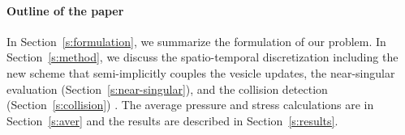 \paragraph{Outline of the paper} 
In Section~\ref{s:formulation}, we summarize the formulation of our
problem. In Section~\ref{s:method}, we discuss the spatio-temporal
discretization including the new scheme that semi-implicitly couples the
vesicle updates, the near-singular evaluation
(Section~\ref{s:near-singular}), and the collision detection
(Section~\ref{s:collision}) .  The average pressure and stress
calculations are in Section~\ref{s:aver} and the results are described
in Section~\ref{s:results}.



